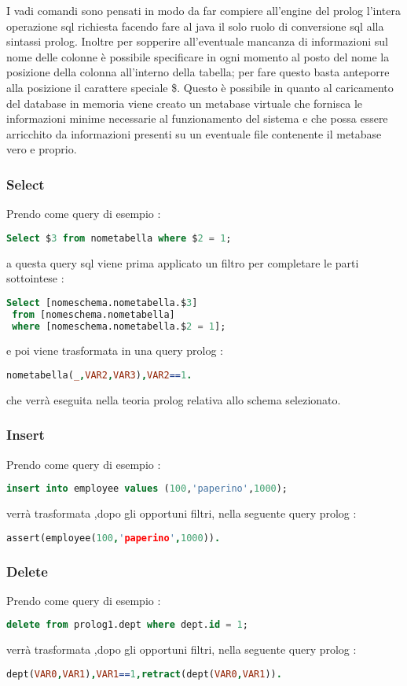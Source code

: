 I vadi comandi sono pensati in modo da far compiere all'engine del prolog l'intera operazione sql richiesta facendo fare al java il solo ruolo di conversione sql alla sintassi prolog. Inoltre per sopperire all'eventuale mancanza di informazioni sul nome delle colonne è possibile specificare in ogni momento al posto del nome la posizione della colonna all'interno della tabella; per fare questo basta anteporre alla posizione il carattere speciale {\$}. Questo è possibile in quanto al caricamento del database in memoria viene creato un metabase virtuale che fornisca le informazioni minime necessarie al funzionamento del sistema e che possa essere arricchito da informazioni presenti su un eventuale file contenente il metabase vero e proprio. 

\subsubsection{Select}
Prendo come query di esempio : 
\begin{lstlisting}[language=Sql]
 Select $3 from nometabella where $2 = 1;
\end{lstlisting}
a questa query sql viene prima applicato un filtro per completare le parti sottointese : 
\begin{lstlisting}[language=Sql]
 Select [nomeschema.nometabella.$3] 
 from [nomeschema.nometabella] 
 where [nomeschema.nometabella.$2 = 1];
\end{lstlisting}
e poi viene trasformata in una query prolog : 
\begin{lstlisting}[language=Prolog]
 nometabella(_,VAR2,VAR3),VAR2==1.
\end{lstlisting}
che verrà eseguita nella teoria prolog relativa allo schema selezionato. 

\subsubsection{Insert}
Prendo come query di esempio : 
\begin{lstlisting}[language=Sql]
 insert into employee values (100,'paperino',1000);
\end{lstlisting}
verrà trasformata ,dopo gli opportuni filtri, nella seguente query prolog : 
\begin{lstlisting}[language=Prolog]
 assert(employee(100,'paperino',1000)).
\end{lstlisting}

\subsubsection{Delete}
Prendo come query di esempio : 
\begin{lstlisting}[language=Sql]
 delete from prolog1.dept where dept.id = 1;
\end{lstlisting}
verrà trasformata ,dopo gli opportuni filtri, nella seguente query prolog : 
\begin{lstlisting}[language=Prolog]
 dept(VAR0,VAR1),VAR1==1,retract(dept(VAR0,VAR1)).
\end{lstlisting}

